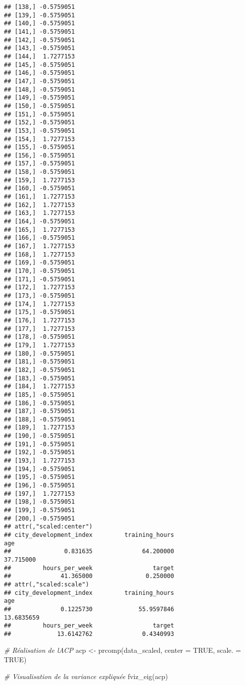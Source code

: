 \documentclass[
]{article}
\newenvironment{Shaded}{\begin{snugshade}}{\end{snugshade}}
\newcommand{\AttributeTok}[1]{\textcolor[rgb]{0.77,0.63,0.00}{#1}}
\newcommand{\CommentTok}[1]{\textcolor[rgb]{0.56,0.35,0.01}{\textit{#1}}}
\newcommand{\ConstantTok}[1]{\textcolor[rgb]{0.00,0.00,0.00}{#1}}
\newcommand{\FunctionTok}[1]{\textcolor[rgb]{0.00,0.00,0.00}{#1}}
\newcommand{\NormalTok}[1]{#1}
\newcommand{\OtherTok}[1]{\textcolor[rgb]{0.56,0.35,0.01}{#1}}
\begin{document}
\begin{verbatim}
## [138,] -0.5759051
## [139,] -0.5759051
## [140,] -0.5759051
## [141,] -0.5759051
## [142,] -0.5759051
## [143,] -0.5759051
## [144,]  1.7277153
## [145,] -0.5759051
## [146,] -0.5759051
## [147,] -0.5759051
## [148,] -0.5759051
## [149,] -0.5759051
## [150,] -0.5759051
## [151,] -0.5759051
## [152,] -0.5759051
## [153,] -0.5759051
## [154,]  1.7277153
## [155,] -0.5759051
## [156,] -0.5759051
## [157,] -0.5759051
## [158,] -0.5759051
## [159,]  1.7277153
## [160,] -0.5759051
## [161,]  1.7277153
## [162,]  1.7277153
## [163,]  1.7277153
## [164,] -0.5759051
## [165,]  1.7277153
## [166,] -0.5759051
## [167,]  1.7277153
## [168,]  1.7277153
## [169,] -0.5759051
## [170,] -0.5759051
## [171,] -0.5759051
## [172,]  1.7277153
## [173,] -0.5759051
## [174,]  1.7277153
## [175,] -0.5759051
## [176,]  1.7277153
## [177,]  1.7277153
## [178,] -0.5759051
## [179,]  1.7277153
## [180,] -0.5759051
## [181,] -0.5759051
## [182,] -0.5759051
## [183,] -0.5759051
## [184,]  1.7277153
## [185,] -0.5759051
## [186,] -0.5759051
## [187,] -0.5759051
## [188,] -0.5759051
## [189,]  1.7277153
## [190,] -0.5759051
## [191,] -0.5759051
## [192,] -0.5759051
## [193,]  1.7277153
## [194,] -0.5759051
## [195,] -0.5759051
## [196,] -0.5759051
## [197,]  1.7277153
## [198,] -0.5759051
## [199,] -0.5759051
## [200,] -0.5759051
## attr(,"scaled:center")
## city_development_index         training_hours                    age 
##               0.831635              64.200000              37.715000 
##         hours_per_week                 target 
##              41.365000               0.250000 
## attr(,"scaled:scale")
## city_development_index         training_hours                    age 
##              0.1225730             55.9597846             13.6835659 
##         hours_per_week                 target 
##             13.6142762              0.4340993
\end{verbatim}

\begin{Shaded}
\begin{Highlighting}[]
\CommentTok{\# Réalisation de l\textquotesingle{}ACP}
\NormalTok{acp }\OtherTok{\textless{}{-}} \FunctionTok{prcomp}\NormalTok{(data\_scaled, }\AttributeTok{center =} \ConstantTok{TRUE}\NormalTok{, }\AttributeTok{scale. =} \ConstantTok{TRUE}\NormalTok{)}

\CommentTok{\# Visualisation de la variance expliquée}
\FunctionTok{fviz\_eig}\NormalTok{(acp)}
\end{Highlighting}
\end{Shaded}
\end{document}
